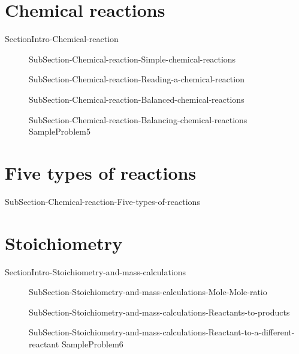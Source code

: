 \documentclass[main.tex]{subfiles}
\newcommand\chapterlabel{Ch-mole}\setcounter{figurenewcounter}{0}\setcounter{tablenewcounter}{0}\setcounter{formulanewcounter}{0}\chapterpicture{../{\chapterlabel}/figure1}\chapterpicturelabel{PngImg}
\begin{document}
\section{Chemical reactions}{SectionIntro-Chemical-reaction}
\sloppy\begin{description}
\item[] {SubSection-Chemical-reaction-Simple-chemical-reactions}
\item[]{SubSection-Chemical-reaction-Reading-a-chemical-reaction}
\item[]{SubSection-Chemical-reaction-Balanced-chemical-reactions}
\item[]{SubSection-Chemical-reaction-Balancing-chemical-reactions}
{SampleProblem5}
\end{description}


\section{Five types of reactions}{SubSection-Chemical-reaction-Five-types-of-reactions}



\section{Stoichiometry}{SectionIntro-Stoichiometry-and-mass-calculations}
\sloppy \begin{description}
\item[]{SubSection-Stoichiometry-and-mass-calculations-Mole-Mole-ratio}
\item[]{SubSection-Stoichiometry-and-mass-calculations-Reactants-to-products}
\item[] {SubSection-Stoichiometry-and-mass-calculations-Reactant-to-a-different-reactant}
{SampleProblem6}
\end{description}
\end{document}
